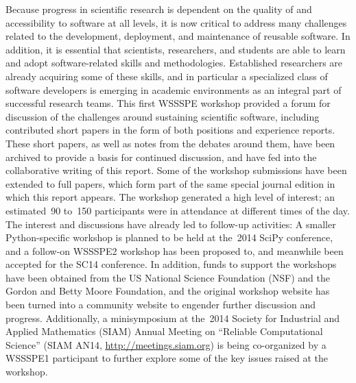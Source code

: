 \documentclass[11pt, oneside]{amsart}
\newcommand{\note}[1]{ {\textcolor{red}    { #1 }}}
\begin{document}
Because progress in scientific research is dependent on the quality of
and accessibility to software at all levels, it is now critical to
address many challenges related to the development, deployment, and
maintenance of reusable software.
In addition, it is essential that scientists, researchers, and
students are able to learn and adopt software-related skills and
methodologies. Established researchers are already acquiring some of
these skills, and in particular a specialized class of software
developers is emerging in academic environments as an integral part of
successful research teams. This first WSSSPE workshop provided a forum
for discussion of the challenges around sustaining scientific
software, including contributed short papers in the form of both
positions and experience reports. These short papers, as well as notes
from the debates around them, have been archived to provide a basis
for continued discussion, and have fed into the collaborative writing
of this report.  Some of the workshop submissions have been extended
to full papers, which form part of the same special journal edition in
which this report appears. The workshop generated a high level of
interest; an estimated~90 to~150 participants were in attendance at
different times of the day. The interest and discussions have already
led to follow-up activities: A smaller Python-specific workshop is
planned to be held at the~2014 SciPy conference, and a follow-on
WSSSPE2 workshop has been proposed to, and meanwhile been accepted for
the SC14 conference. In addition, funds to support the workshops have
been obtained from the US National Science Foundation (NSF) and the
Gordon and Betty Moore Foundation, and the original workshop website
has been turned into a community website to engender further
discussion and progress. Additionally, a minisymposium at the~2014
Society for Industrial and Applied Mathematics (SIAM) Annual Meeting
on ``Reliable Computational Science'' (SIAM AN14,
\url{http://meetings.siam.org}) is being co-organized by a WSSSPE1
participant to further explore some of the key issues raised at the
workshop.
\end{document}
